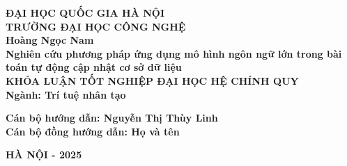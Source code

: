 \thispagestyle{empty}
\usetikzlibrary{calc}

\begin{center}

\fontsize{12pt}{1pt}\selectfont
\textbf{ĐẠI HỌC QUỐC GIA HÀ NỘI}\\
\textbf{TRƯỜNG ĐẠI HỌC CÔNG NGHỆ}\\[1.5cm]


\fontsize{14pt}{6pt}\selectfont
\textbf{Hoàng Ngọc Nam} \\[2cm]

\fontsize{16pt}{6pt}\selectfont
\textbf{Nghiên cứu phương pháp ứng dụng mô hình ngôn ngữ lớn trong bài toán tự động cập nhật cơ sở dữ liệu}\\ [3 cm]



\fontsize{14pt}{6pt}\selectfont
\textbf{KHÓA LUẬN TỐT NGHIỆP ĐẠI HỌC HỆ CHÍNH QUY} \\[0.2 cm]
\textbf{Ngành: Trí tuệ nhân tạo}\\[3cm]

\begin{flushleft}
\fontsize{14pt}{6pt}\selectfont
\textbf{Cán bộ hướng dẫn: Nguyễn Thị Thùy Linh }\\[0.2 cm]
\textbf{Cán bộ đồng hướng dẫn: Họ và tên}\\[6.6 cm]
\end{flushleft}

\fontsize{12pt}{6pt}\selectfont
\textbf{HÀ NỘI - 2025} 
\end{center}